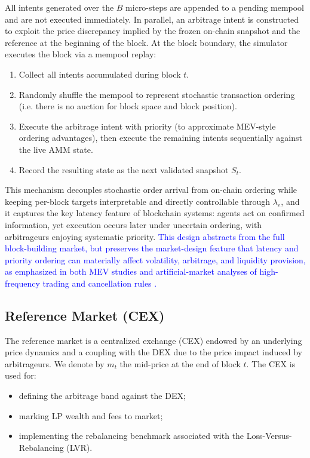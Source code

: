 \documentclass[11pt]{article}
\begin{document}
All intents generated over the $B$ micro-steps are appended to a pending mempool and
are not executed immediately. In parallel, an arbitrage intent is constructed
to exploit the price discrepancy implied by the frozen on-chain snapshot and the
reference  at the beginning of the block. At the block boundary, the simulator executes the block via
a mempool replay:
\begin{enumerate}[leftmargin=*]
  \item Collect all intents accumulated during block $t$.
  \item Randomly shuffle the mempool to represent stochastic transaction ordering (i.e. there is no auction for block space and block position).
  \item Execute the arbitrage intent with priority (to approximate MEV-style
        ordering advantages), then execute the remaining intents sequentially against
        the live AMM state.
  \item Record the resulting state as the next validated snapshot $S_t$.
\end{enumerate}
This mechanism decouples stochastic order arrival from on-chain ordering while keeping
per-block targets interpretable and directly controllable through $\lambda_e$, and it
captures the key latency feature of blockchain systems: agents act on confirmed
information, yet execution occurs later under uncertain ordering, with arbitrageurs
enjoying systematic priority. \textcolor{blue}{This design abstracts from the full block-building market, but preserves the market-design feature that latency and priority ordering can materially affect volatility, arbitrage, and liquidity provision, as emphasized in both MEV studies and artificial-market analyses of high-frequency trading and cancellation rules \cite{flashboys,leal2016,gao2024,yagi2020}.}

\subsection{Reference Market (CEX)}
\label{subsec:cex}

The reference market is a centralized exchange (CEX) endowed by an underlying price dynamics
and a coupling with the DEX due to the price impact induced by arbitrageurs.
We denote by $m_t$ the mid-price at the end of block $t$. The CEX is used for:
\begin{itemize}[leftmargin=*]
  \item defining the arbitrage band against the DEX;
  \item marking LP wealth and fees to market;
  \item implementing the rebalancing benchmark associated with the Loss-Versus-Rebalancing (LVR).
\end{itemize}
\end{document}
